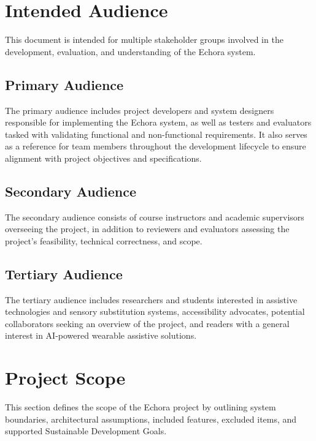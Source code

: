 \section{Intended Audience}

This document is intended for multiple stakeholder groups involved in the development, evaluation, and understanding of the Echora system.

\subsection{Primary Audience}
\label{subsubsec:primary_audience}

The primary audience includes project developers and system designers responsible for implementing the Echora system, as well as testers and evaluators tasked with validating functional and non-functional requirements. It also serves as a reference for team members throughout the development lifecycle to ensure alignment with project objectives and specifications.

\subsection{Secondary Audience}
\label{subsubsec:secondary_audience}

The secondary audience consists of course instructors and academic supervisors overseeing the project, in addition to reviewers and evaluators assessing the project’s feasibility, technical correctness, and scope.

\subsection{Tertiary Audience}
\label{subsubsec:tertiary_audience}

The tertiary audience includes researchers and students interested in assistive technologies and sensory substitution systems, accessibility advocates, potential collaborators seeking an overview of the project, and readers with a general interest in AI-powered wearable assistive solutions.

\section{Project Scope}

This section defines the scope of the Echora project by outlining system boundaries, architectural assumptions, included features, excluded items, and supported Sustainable Development Goals.

